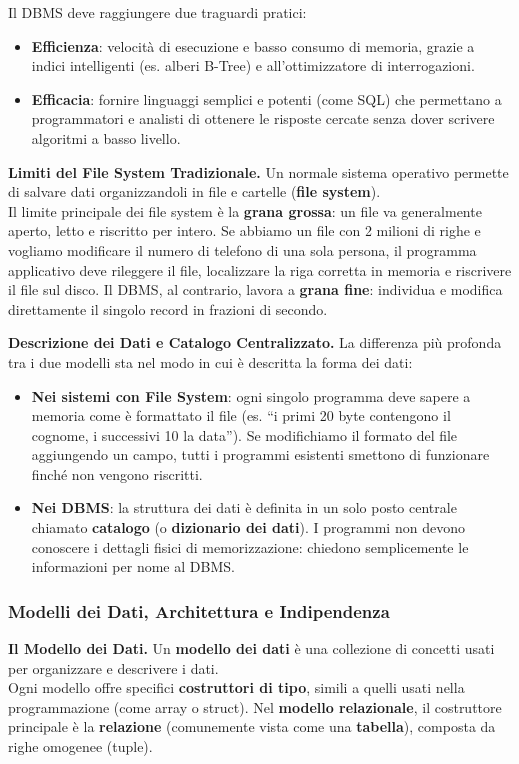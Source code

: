 \documentclass[12pt]{extarticle}
\begin{document}
\noindent Il DBMS deve raggiungere due traguardi pratici:
\begin{itemize}
    \item \textbf{Efficienza}: velocità di esecuzione e basso consumo di memoria, grazie a indici intelligenti (es. alberi B-Tree) e all'ottimizzatore di interrogazioni.
    \item \textbf{Efficacia}: fornire linguaggi semplici e potenti (come SQL) che permettano a programmatori e analisti di ottenere le risposte cercate senza dover scrivere algoritmi a basso livello.
\end{itemize}

\medskip
\noindent \textbf{Limiti del File System Tradizionale.} Un normale sistema operativo permette di salvare dati organizzandoli in file e cartelle (\textbf{file system}). \\
Il limite principale dei file system è la \textbf{grana grossa}: un file va generalmente aperto, letto e riscritto per intero. Se abbiamo un file con 2 milioni di righe e vogliamo modificare il numero di telefono di una sola persona, il programma applicativo deve rileggere il file, localizzare la riga corretta in memoria e riscrivere il file sul disco. Il DBMS, al contrario, lavora a \textbf{grana fine}: individua e modifica direttamente il singolo record in frazioni di secondo.

\medskip
\noindent \textbf{Descrizione dei Dati e Catalogo Centralizzato.} La differenza più profonda tra i due modelli sta nel modo in cui è descritta la forma dei dati:
\begin{itemize}
    \item \textbf{Nei sistemi con File System}: ogni singolo programma deve sapere a memoria come è formattato il file (es. ``i primi 20 byte contengono il cognome, i successivi 10 la data''). Se modifichiamo il formato del file aggiungendo un campo, tutti i programmi esistenti smettono di funzionare finché non vengono riscritti.
    \item \textbf{Nei DBMS}: la struttura dei dati è definita in un solo posto centrale chiamato \textbf{catalogo} (o \textbf{dizionario dei dati}). I programmi non devono conoscere i dettagli fisici di memorizzazione: chiedono semplicemente le informazioni per nome al DBMS.
\end{itemize}

\subsubsection{Modelli dei Dati, Architettura e Indipendenza}
\noindent \textbf{Il Modello dei Dati.} Un \textbf{modello dei dati} è una collezione di concetti usati per organizzare e descrivere i dati. \\
Ogni modello offre specifici \textbf{costruttori di tipo}, simili a quelli usati nella programmazione (come array o struct). Nel \textbf{modello relazionale}, il costruttore principale è la \textbf{relazione} (comunemente vista come una \textbf{tabella}), composta da righe omogenee (tuple).
\end{document}
